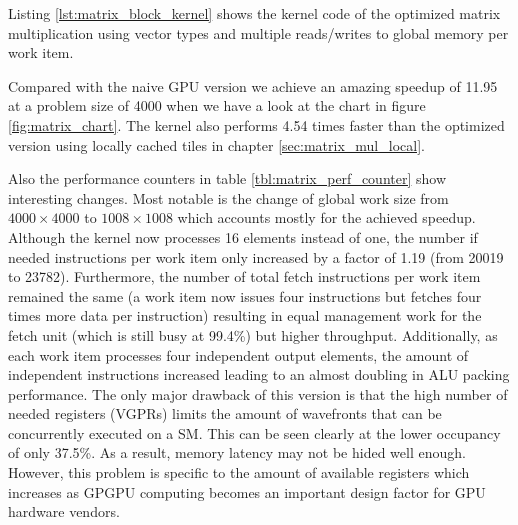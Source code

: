 Listing \ref{lst:matrix_block_kernel} shows the kernel code of the optimized matrix multiplication using vector types and multiple reads/writes to global memory per work item.



\pagebreak

Compared with the naive GPU version we achieve an amazing speedup of 11.95 at a problem size of 4000 when we have a look at the chart in figure \ref{fig:matrix_chart}. %
The kernel also performs 4.54 times faster than the optimized version using locally cached tiles in chapter \ref{sec:matrix_mul_local}.

Also the performance counters in table \ref{tbl:matrix_perf_counter} show interesting changes. Most notable is the change of global work size from $4000 \times 4000$ to $1008 \times 1008$ which accounts mostly for the achieved speedup. Although the kernel now processes 16 elements instead of one, the number if needed instructions per work item only increased by a factor of 1.19 (from 20019 to 23782). Furthermore, the number of total fetch instructions per work item remained the same (a work item now issues four instructions but fetches four times more data per instruction) resulting in equal management work for the fetch unit (which is still busy at 99.4\%) but higher throughput. Additionally, as each work item processes four independent output elements, the amount of independent instructions increased leading to an almost doubling in ALU packing performance. The only major drawback of this version is that the high number of needed registers (VGPRs) limits the amount of wavefronts that can be concurrently executed on a SM. This can be seen clearly at the lower occupancy of only 37.5\%. As a result, memory latency may not be hided well enough. However, this problem is specific to the amount of available registers which increases as GPGPU computing becomes an important design factor for GPU hardware vendors.


